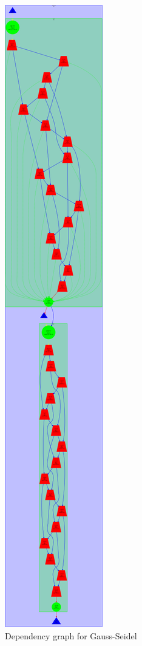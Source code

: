 \documentclass[12]{article}
\begin{document}
\begin{figure}[H]
    \centering
    \includegraphics[scale=0.3]{images/dependency_gauss.png}
    \caption{Dependency graph for Gauss-Seidel}
    \label{Gauss_seidel_dependency}
\end{figure}
\end{document}
